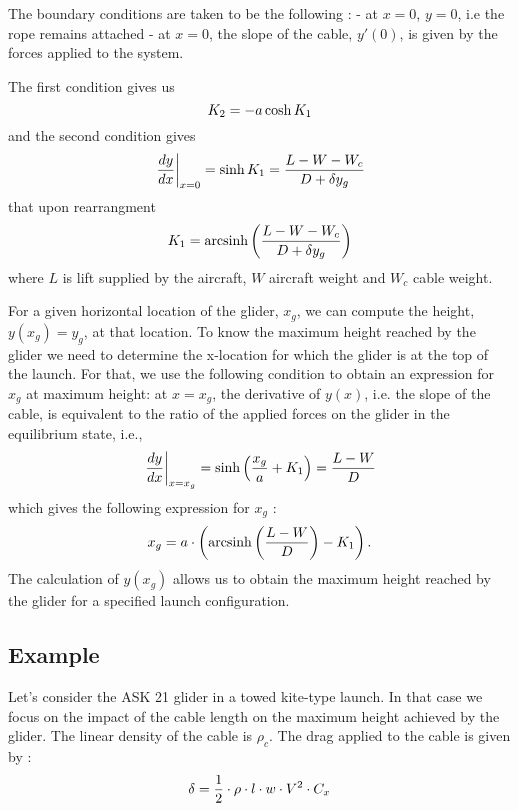 \documentclass[11pt]{amsart}
\DeclareMathOperator{\arcsinh}{arcsinh}
\begin{document}
The boundary conditions are taken to be the following :\newline
- at $x=0$, $y=0$, i.e the rope remains attached \newline
- at $x=0$, the slope of the cable, $y\prime(0)$, is given by the forces applied to the system.

The first condition gives us
\begin{equation}
	\centering
	K_2 =-a \cosh{K_1}
	\label{eq:K2}
\end{equation}
and the second condition gives
\begin{equation}
	\centering
	\left. \frac{dy}{dx}\right|_{x=0} = \sinh{K_1} = \frac{L-W-W_c}{D + \delta y_g}
	\label{eq:bc1}
\end{equation}
that upon rearrangment
\begin{equation}
	\centering
	K_1 = \arcsinh \left(\frac{L-W-W_c}{D + \delta y_g}\right)
	\label{eq:K1}
\end{equation}
where $L$ is lift supplied by the aircraft, $W$ aircraft weight and $W_c$ cable weight.

For a given horizontal location of the glider, $x_g$, we can compute the height, $y(x_g)=y_g$, at that location. To know the maximum height reached by the glider we need to determine the x-location for which the glider is at the top of the launch. For that, we use the following condition to obtain an expression for $x_g$ at maximum height: at $x=x_g$, the derivative of $y(x)$, i.e. the slope of the cable, is equivalent to the ratio of the applied forces on the glider in the equilibrium state, i.e.,  
\begin{equation}
	\centering
	\left. \frac{dy}{dx}\right|_{x=x_g}=\sinh\left(\frac{x_g}{a} + K_1 \right) = \frac{L-W}{D}
	\label{eq:bc2}
\end{equation}
which gives the following expression for $x_g$ : 
\begin{equation}
	\centering
	 x_g=a \cdot \left( \arcsinh \left(\frac{L-W}{D}\right) - K_1 \right).
	\label{eq:x_g}
\end{equation}
The calculation of $y(x_g)$ allows us to obtain the maximum height reached by the glider for a specified launch configuration.


\subsection{Example}

Let's consider the ASK 21 glider in a towed kite-type launch. In that case we focus on the impact of the cable length on the maximum height achieved by the glider. The linear density of the cable is $\rho_c$. The drag applied to the cable is given by : 
\begin{equation}
	\centering
	\delta=\frac{1}{2}\cdot \rho \cdot l \cdot w \cdot V^2 \cdot C_x
	\label{eq:delta}
\end{equation}
\end{document}
